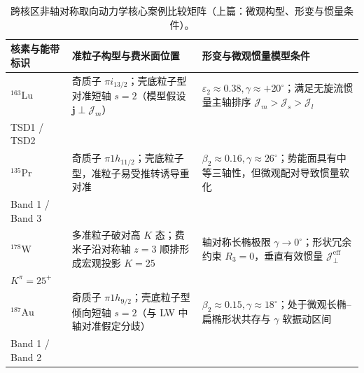 \begin{table}[!htbp]
\centering
\small
\caption{跨核区非轴对称取向动力学核心案例比较矩阵（上篇：微观构型、形变与惯量条件）。}\label{tab:4-4-cross-region-comparison-a}\label{tab:4-4-cross-region-comparison}
\begin{tabularx}{\textwidth}{p{2.6cm} p{5.5cm} >{\raggedright\arraybackslash}X}
\hline\hline
核素与能带标识 & 准粒子构型与费米面位置 & 形变与微观惯量模型条件 \\
\hline
$^{163}\mathrm{Lu}$ & 奇质子 $\pi i_{13/2}$；壳底粒子型对准短轴 $s=2$（模型假设 $\mathbf{j} \perp \mathcal{J}_m$） & $\varepsilon_2 \approx 0.38, \gamma \approx +20^\circ$；满足无旋流惯量主轴排序 $\mathcal{J}_m > \mathcal{J}_s > \mathcal{J}_l$ \\
TSD1 / TSD2 & & \\
\hline
$^{135}\mathrm{Pr}$ & 奇质子 $\pi 1h_{11/2}$；壳底粒子型，准粒子易受推转诱导重对准 & $\beta_2 \approx 0.16, \gamma \approx 26^\circ$；势能面具有中等三轴性，但微观配对导致惯量软化 \\
Band 1 / Band 3 & & \\
\hline
$^{178}\mathrm{W}$ & 多准粒子破对高 $K$ 态；费米子沿对称轴 $z=3$ 顺排形成宏观投影 $K = 25$ & 轴对称长椭极限 $\gamma \to 0^\circ$；形状冗余约束 $R_3 = 0$，垂直有效惯量 $\mathcal{J}_\perp^{\text{eff}}$ \\
$K^\pi = 25^+$ & & \\
\hline
$^{187}\mathrm{Au}$ & 奇质子 $\pi 1h_{9/2}$；壳底粒子型倾向短轴 $s=2$（与 LW 中轴对准假定分歧） & $\beta_2 \approx 0.15, \gamma \approx 18^\circ$；处于微观长椭--扁椭形状共存与 $\gamma$ 软振动区间 \\
Band 1 / Band 2 & & \\
\hline\hline
\end{tabularx}
\end{table}

